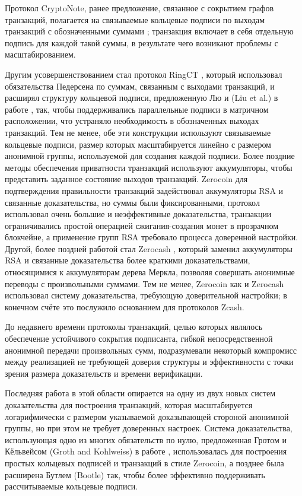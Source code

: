 \documentclass{article}
\theoremstyle{definition}
\begin{document}
Протокол CryptoNote, ранее предложение, связанное с сокрытием графов транзакций, полагается на связываемые кольцевые подписи по выходам транзакций с обозначенными суммами \cite{cryptonote}; транзакция включает в себя отдельную подпись для каждой такой суммы, в результате чего возникают проблемы с масштабированием.

Другим усовершенствованием стал протокол RingCT \cite{ringct}, который использовал обязательства Педерсена по суммам, связанным с выходами транзакций, и расширял структуру кольцевой подписи, предложенную Лю и  (Liu et al.) в работе \cite{liu}, так, чтобы поддерживались параллельные подписи в матричном расположении, что устраняло необходимость в обозначенных выходах транзакций.
Тем не менее, обе эти конструкции используют связываемые кольцевые подписи, размер которых масштабируется линейно с размером анонимной группы, используемой для создания каждой подписи.
Более поздние методы обеспечения приватности транзакций используют аккумуляторы, чтобы представить заданное состояние выходов транзакций.
Zerocoin \cite{zerocoin} для подтверждения правильности транзакций задействовал аккумуляторы RSA и связанные доказательства, но суммы были фиксированными, протокол использовал очень большие и неэффективные доказательства, транзакции ограничивались простой операцией сжигания-создания монет в прозрачном блокчейне, а применение групп RSA требовало процесса доверенной настройки.
Другой, более поздней работой стал Zerocash \cite{zerocash}, который заменил аккумуляторы RSA и связанные доказательства более краткими доказательствами, относящимися к аккумуляторам дерева Меркла, позволяя совершать анонимные переводы с произвольными суммами.
Тем не менее, Zerocoin как и Zerocash использовал систему доказательства, требующую доверительной настройки; в конечном счёте это послужило основанием для протоколов Zcash.

До недавнего времени протоколы транзакций, целью которых являлось обеспечение устойчивого сокрытия подписанта, гибкой непосредственной анонимной передачи произвольных сумм, подразумевали некоторый компромисс между реализацией не требующей доверия структуры и эффективности с точки зрения размера доказательств и времени верификации.

Последняя работа в этой области опирается на одну из двух новых систем доказательства для построения транзакций, которая масштабируется логарифмически с размером указываемой доказывающей стороной анонимной группы, но при этом не требует доверенных настроек. Система доказательства, использующая одно из многих обязательств по нулю, предложенная Гротом и Кёльвейсом (Groth and Kohlweiss) в работе \cite{groth}, использовалась для построения простых кольцевых подписей и транзакций в стиле Zerocoin, а позднее была расширена Бутлем (Bootle) \cite{bootle} так, чтобы более эффективно поддерживать рассчитываемые кольцевые подписи.
\end{document}
